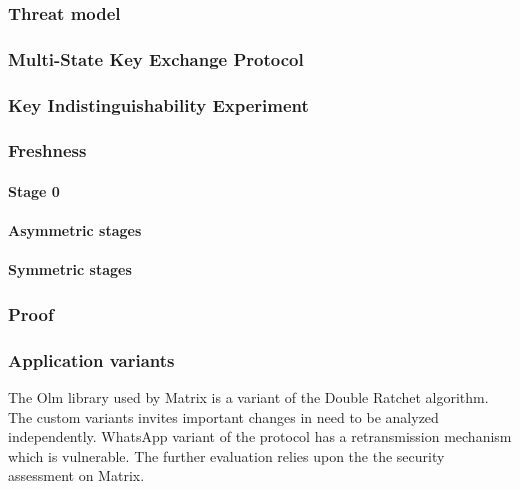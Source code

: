 \subsubsection{Threat model}

\subsubsection{Multi-State Key Exchange Protocol}

\subsubsection{Key Indistinguishability Experiment}

\subsubsection{Freshness}

\paragraph{Stage 0}

\paragraph{Asymmetric stages}

\paragraph{Symmetric stages}

\subsubsection{Proof}


\subsubsection{Application variants}

The Olm library used by Matrix is a variant of the Double Ratchet algorithm. The custom variants invites important changes in need to be analyzed independently. WhatsApp variant of the protocol has a retransmission mechanism which is vulnerable. 
The further evaluation relies upon the the security assessment on Matrix. 

